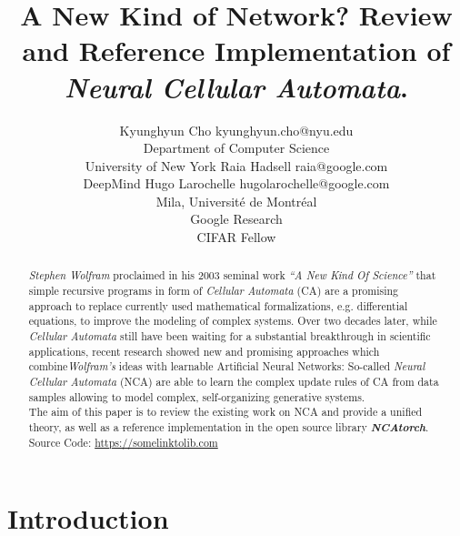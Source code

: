 \documentclass[10pt]{article} %
\title{A New Kind of Network? Review and Reference Implementation of \textit{Neural Cellular Automata}. }
\author{\name Kyunghyun Cho \email kyunghyun.cho@nyu.edu \\
      \addr Department of Computer Science\\
      University of New York
      \AND
      \name Raia Hadsell \email raia@google.com \\
      \addr DeepMind
      \AND
      \name Hugo Larochelle \email hugolarochelle@google.com\\
      \addr Mila, Universit\'e de Montr\'eal \\
      Google Research\\
      CIFAR Fellow}
\begin{document}
\maketitle

\begin{abstract}
\textit{Stephen Wolfram} proclaimed in his 2003 seminal work \textit{``A New Kind Of Science''} that simple recursive programs in form of \textit{Cellular Automata} (CA) are a promising approach to replace currently used mathematical formalizations, e.g. differential equations, to improve the modeling of complex systems.    
Over two decades later, while \textit{Cellular Automata} still have been waiting for a substantial breakthrough in scientific applications, recent research showed new and promising approaches which combine\textit{Wolfram's} ideas with learnable Artificial Neural Networks: So-called \textit{Neural Cellular Automata} (NCA) are able to learn the complex update rules of CA from data samples allowing to model complex, self-organizing generative systems.\\
The aim of this paper is to review the existing work on NCA and provide a unified theory, as well as a reference implementation in the open source library \textit{\textbf{NCAtorch}}.\\

Source Code: \url{https://somelinktolib.com} 
\end{abstract}

\section{Introduction}

%
\end{document}
